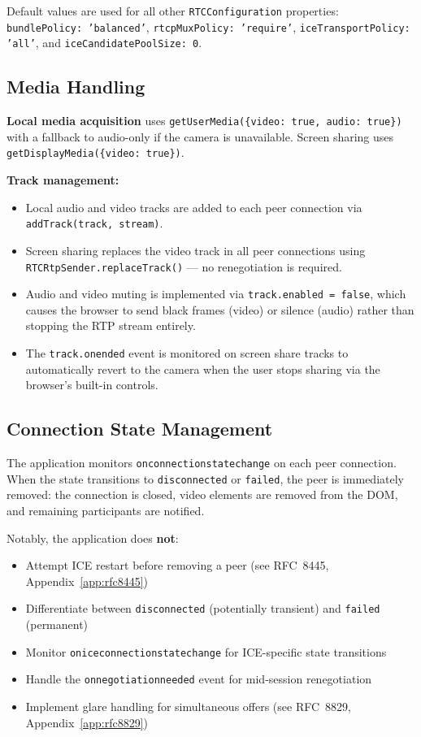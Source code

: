 \documentclass[11pt,letterpaper]{article}
\begin{document}
Default values are used for all other \texttt{RTCConfiguration} properties: \texttt{bundlePolicy: 'balanced'}, \texttt{rtcpMuxPolicy: 'require'}, \texttt{iceTransportPolicy: 'all'}, and \texttt{iceCandidatePoolSize: 0}.

\subsection{Media Handling}

\textbf{Local media acquisition} uses \texttt{getUserMedia(\{video: true, audio: true\})} with a fallback to audio-only if the camera is unavailable. Screen sharing uses \texttt{getDisplayMedia(\{video: true\})}.

\textbf{Track management:}
\begin{itemize}[leftmargin=2em]
    \item Local audio and video tracks are added to each peer connection via \texttt{addTrack(track, stream)}.
    \item Screen sharing replaces the video track in all peer connections using \texttt{RTCRtpSender.replaceTrack()} --- no renegotiation is required.
    \item Audio and video muting is implemented via \texttt{track.enabled = false}, which causes the browser to send black frames (video) or silence (audio) rather than stopping the RTP stream entirely.
    \item The \texttt{track.onended} event is monitored on screen share tracks to automatically revert to the camera when the user stops sharing via the browser's built-in controls.
\end{itemize}

\subsection{Connection State Management}

The application monitors \texttt{onconnectionstatechange} on each peer connection. When the state transitions to \texttt{disconnected} or \texttt{failed}, the peer is immediately removed: the connection is closed, video elements are removed from the DOM, and remaining participants are notified.

Notably, the application does \textbf{not}:
\begin{itemize}[leftmargin=2em]
    \item Attempt ICE restart before removing a peer (see RFC~8445, Appendix~\ref{app:rfc8445})
    \item Differentiate between \texttt{disconnected} (potentially transient) and \texttt{failed} (permanent)
    \item Monitor \texttt{oniceconnectionstatechange} for ICE-specific state transitions
    \item Handle the \texttt{onnegotiationneeded} event for mid-session renegotiation
    \item Implement glare handling for simultaneous offers (see RFC~8829, Appendix~\ref{app:rfc8829})
\end{itemize}
\end{document}
